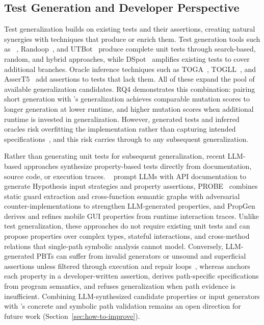 \subsection{Test Generation and Developer Perspective}%
\label{sec:rw-synergies}

Test generalization builds on existing tests and their assertions,
creating natural synergies with techniques that produce or enrich them.
Test generation tools such as
\ToolEvoSuite{}~\cite{fraser_2011_evosuite}, Randoop~\cite{pacheco_2007_randoop},
and UTBot~\cite{utbot_2024_sbft}
produce complete unit tests through search-based, random, and hybrid approaches,
while DSpot~\cite{danglot_2019_dspot} amplifies existing tests to cover additional branches.
Oracle inference techniques such as
TOGA~\cite{dinella_2022_toga}, TOGLL~\cite{hossain_2024_togll}, and AsserT5~\cite{primbs_2025_assert5}
add assertions to tests that lack them.
All of these expand the pool of available generalization candidates.
RQ4 demonstrates this combination:
pairing short \ToolEvoSuite{} generation with \ToolTeralizer{}'s generalization
achieves comparable mutation scores to longer \ToolEvoSuite{} generation at lower runtime,
and higher mutation scores when additional runtime is invested in generalization.
However, generated tests and inferred oracles
risk overfitting the implementation
rather than capturing intended specifications~\cite{barr_2015_oracle},
and this risk carries through to any subsequent generalization.

Rather than generating unit tests for subsequent generalization,
recent LLM-based approaches synthesize property-based tests directly
from documentation, source code, or execution traces.
\citeauthor{vikram_2024_pbt}~\cite{vikram_2024_pbt} prompt LLMs with API documentation
to generate Hypothesis input strategies and property assertions,
PROBE~\cite{li_2026_probe} combines static guard extraction and cross-function semantic graphs
with adversarial counter-implementations to strengthen LLM-generated properties,
and PropGen~\cite{xiong_2026_propgen} derives and refines mobile GUI properties from runtime interaction traces.
Unlike test generalization, these approaches do not require existing unit tests
and can propose properties over complex types, stateful interactions, and cross-method relations
that single-path symbolic analysis cannot model.
Conversely, LLM-generated PBTs can suffer from invalid generators
or unsound and superficial assertions unless filtered through execution and repair loops~\cite{vikram_2024_pbt,li_2026_probe},
whereas \ToolTeralizer{} anchors each property in a developer-written assertion,
derives path-specific specifications from program semantics,
and refuses generalization when path evidence is insufficient.
Combining LLM-synthesized candidate properties or input generators
with \ToolTeralizer{}'s concrete and symbolic path validation remains an open direction for future work (Section~\ref{sec:how-to-improve}).

